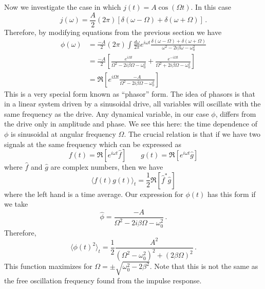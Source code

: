 \documentclass{article}
\begin{document}
Now we investigate the case in which $j(t)=A\cos(\Omega t)$.
In this case
\begin{equation}
j(\omega)=\frac{A}{2}(2\pi)\left[\delta(\omega-\Omega)+\delta(\omega+\Omega)\right] \, .
\end{equation}
Therefore, by modifying equations from the previous section we have
\begin{align}
\phi(\omega)
& = \frac{-A}{2}(2\pi) \int \frac{d\omega}{2\pi} e^{i \omega t} \frac{\delta(\omega-\Omega)+\delta(\omega+\Omega)}{\omega^{2} - 2i\beta\omega - \omega_0^2} \\
& =
\frac{-A}{2}
\left[
\frac{e^{i \Omega t}}{\Omega^{2} - 2i\beta\Omega - \omega_0^2} +
\frac{e^{-i \Omega t}}{\Omega^2 + 2i\beta\Omega - \omega_0^2}
\right] \\
&= \Re \left[ e^{i \Omega t} \frac{-A}{\Omega^2 - 2i\beta\Omega - \omega_0^2}
\right] \label{eq:phasor_form}
\end{align}
This is a very special form known as {}``phasor'' form.
The idea of phasors is that in a linear system driven by a sinusoidal drive, all variables will oscillate with the same frequency as the drive.
Any dynamical variable, in our case $\phi$, differs from the drive only in amplitude and phase.
We see this here: the time dependence of $\phi$ is sinusoidal at angular frequency $\Omega$.
The crucial relation is that if we have two signals at the same frequency which can be expressed as \begin{equation}
f(t) = \Re[ e^{i\omega t} \hat{f}] \qquad
g(t) = \Re[ e^{i\omega t} \hat{g}]
\end{equation}
where $\hat{f}$ and $\hat{g}$ are complex numbers, then we have \begin{equation}
\langle f(t)g(t)\rangle_{t}=\frac{1}{2}\Re[\hat{f}^{*}\hat{g}] \end{equation}
where the left hand is a time average.
Our expression for $\phi(t)$ has this form if we take
\begin{equation}
\hat{\phi} = \frac{-A}{\Omega^{2} - 2i\beta\Omega - \omega_0^2} \, .
\end{equation}
Therefore, \begin{equation}
  \langle\phi(t)^{2}\rangle_{t}
  = \frac{1}{2} \frac{A^{2}}{(\Omega^{2}-\omega_0^{2})^{2}+(2\beta\Omega)^2}
  \, .
\end{equation}
This function maximizes for $\Omega=\pm\sqrt{\omega_{0}^{2}-2\beta^{2}}$.
Note that this is not the same as the free oscillation frequency found from the impulse response.
\end{document}
